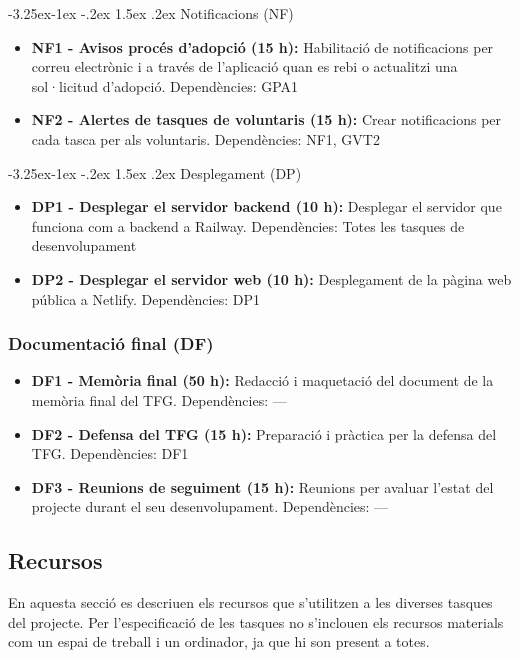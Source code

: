 \documentclass[11pt,a4paper]{report}
\makeatletter
\renewcommand\paragraph{\@startsection{paragraph}{4}{\z@}%
    {-3.25ex\@plus -1ex \@minus -.2ex}%
    {1.5ex \@plus .2ex}
    {\normalfont\normalsize\bfseries}}
\makeatother
\begin{document}
\paragraph{Notificacions (NF)}
\begin{itemize}
    \item \textbf{NF1 - Avisos procés d'adopció (15 h):} Habilitació de notificacions per correu electrònic i a través de l'aplicació quan es rebi o actualitzi una sol·licitud d'adopció. Dependències: GPA1
    \item \textbf{NF2 - Alertes de tasques de voluntaris (15 h):} Crear notificacions per cada tasca per als voluntaris. Dependències: NF1, GVT2
\end{itemize}

\paragraph{Desplegament (DP)}
\begin{itemize}
    \item \textbf{DP1 - Desplegar el servidor backend (10 h):} Desplegar el servidor que funciona com a backend a Railway. Dependències: Totes les tasques de desenvolupament
    \item \textbf{DP2 - Desplegar el servidor web (10 h):} Desplegament de la pàgina web pública a Netlify. Dependències: DP1
\end{itemize}

\subsubsection{Documentació final (DF)}
\begin{itemize}
    \item \textbf{DF1 - Memòria final (50 h):} Redacció i maquetació del document de la memòria final del TFG. Dependències: ---
    \item \textbf{DF2 - Defensa del TFG (15 h):} Preparació i pràctica per la defensa del TFG. Dependències: DF1
    \item \textbf{DF3 - Reunions de seguiment (15 h):} Reunions per avaluar l'estat del projecte durant el seu desenvolupament. Dependències: ---
\end{itemize}
\subsection{Recursos}
En aquesta secció es descriuen els recursos que s'utilitzen a les diverses tasques del projecte. Per l'especificació de les tasques no s'inclouen els recursos materials com un espai de treball i un ordinador, ja que hi son present a totes.
\end{document}
